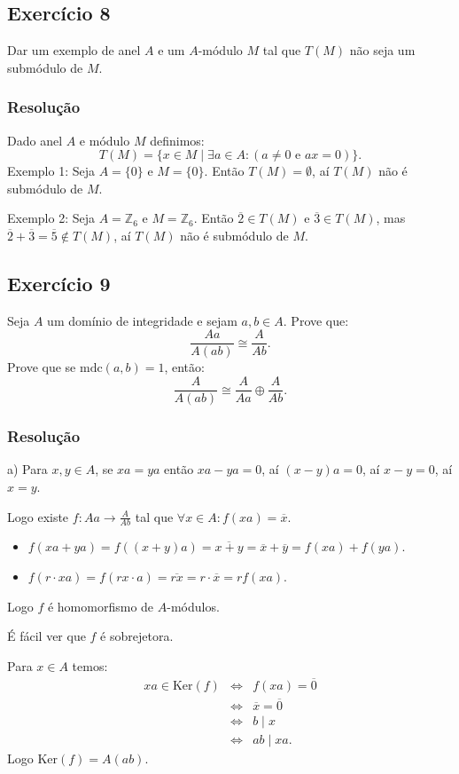 \documentclass[10pt,a4paper]{article}
\begin{document}
\subsection*{Exercício 8}

Dar um exemplo de anel $A$ e um $A$-módulo $M$ tal que $T(M)$ não seja um submódulo de $M$.

\subsubsection*{Resolução}

Dado anel $A$ e módulo $M$ definimos:
\[
T(M)=\{x\in M\mid\exists a\in A:(a\neq 0\text{ e }ax=0)\}.
\]
Exemplo 1: Seja $A=\{0\}$ e $M=\{0\}$. Então $T(M)=\emptyset$, aí $T(M)$ não é submódulo de $M$.

\medskip
\noindent
Exemplo 2: Seja $A=\mathbb{Z}_6$ e $M=\mathbb{Z}_6$. Então $\overline{2}\in T(M)$ e $\overline{3}\in T(M)$, mas $\overline{2}+\overline{3}=\overline{5}\notin T(M)$, aí $T(M)$ não é submódulo de $M$.

\subsection*{Exercício 9}

Seja $A$ um domínio de integridade e sejam $a,b\in A$. Prove que:
\[
\frac{Aa}{A(ab)}\cong\frac{A}{Ab}.
\]
Prove que se $\mathrm{mdc}(a,b)=1$, então:
\[
\frac{A}{A(ab)}\cong\frac{A}{Aa}\oplus\frac{A}{Ab}.
\]

\subsubsection*{Resolução}

a) Para $x,y\in A$, se $xa=ya$ então $xa-ya=0$, aí $(x-y)a=0$, aí $x-y=0$, aí $x=y$.

\medskip
\noindent
Logo existe $f:Aa\rightarrow\frac{A}{Ab}$ tal que $\forall x\in A:f(xa)=\overline{x}$.

\begin{itemize}
\item $f(xa+ya)=f((x+y)a)=\overline{x+y}=\overline{x}+\overline{y}=f(xa)+f(ya)$.
\item $f(r\cdot xa)=f(rx\cdot a)=\overline{rx}=r\cdot\overline{x}=rf(xa)$.
\end{itemize}
Logo $f$ é homomorfismo de $A$-módulos.

\medskip
\noindent
É fácil ver que $f$ é sobrejetora.

\medskip
\noindent
Para $x\in A$ temos:
\[
\begin{array}{rcl}
xa\in\mathrm{Ker}(f)&\Leftrightarrow&f(xa)=\overline{0}\\&\Leftrightarrow&\overline{x}=\overline{0}\\&\Leftrightarrow&b\mid x\\&\Leftrightarrow&ab\mid xa.
\end{array}
\]
Logo $\mathrm{Ker}(f)=A(ab)$.
\end{document}
